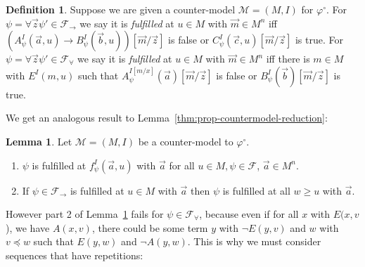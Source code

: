 \documentclass[a4paper,12pt]{report}
\theoremstyle{definition}
\theoremstyle{definition}
\theoremstyle{definition}
\newtheorem{lemma}[theorem]{Lemma}
\theoremstyle{definition}
\theoremstyle{definition}
\newtheorem{definition}[theorem]{Definition}
\theoremstyle{definition}
\theoremstyle{definition}
\begin{document}
	
	\begin{definition}
		\label{def:fo-fulfilled}
		Suppose we are given a counter-model $\mathcal M = (M, I)$ for $\varphi^\circ$. For $\psi = \forall\vec z\psi'\in\mathcal F_\to$ we say it is \emph{fulfilled} at $u\in M$ with $\vec m\in M^n$ iff $(A_\psi^I(\vec a, u)\to B_\psi^I(\vec b, u))[\vec m/\vec z]$ is false or $C_\psi^I(\vec c, u)[\vec m/\vec z]$ is true.
		For $\psi = \forall\vec z\psi'\in\mathcal F_\forall$ we say it is \emph{fulfilled} at $u\in M$ with $\vec m\in M^n$ iff there is $m\in M$ with $E^{I}(m, u)$ such that $A^{I[m/x]}_\psi(\vec a)[\vec m/\vec z]$ is false or $B_\psi^I(\vec b)[\vec m/\vec z]$ is true.
	\end{definition}
	
	We get an analogous result to Lemma~\ref{thm:prop-countermodel-reduction}:
	
	\begin{lemma}
		\label{thm:fo-countermodel-reduction}
		Let $\mathcal M = (M, I)$ be a counter-model to $\mathcal \varphi^\circ$.
		\begin{enumerate}
			\item $\psi$ is fulfilled at $f_\psi^I(\vec a, u)$ with $\vec a$ for all $u\in M, \psi\in\mathcal F$, $\vec a\in M^n$.
			\item If $\psi\in\mathcal F_\to$ is fulfilled at $u\in M$ with $\vec a$ then $\psi$ is fulfilled at all $w\geq u$ with $\vec a$.
		\end{enumerate}	
	\end{lemma}
	
	However part 2 of Lemma~\ref{thm:fo-countermodel-reduction} fails for $\psi\in\mathcal F_\forall$, because even if for all $x$ with $E(x, v$), we have $A(x, v)$, there could be some term $y$ with $\neg E(y, v)$ and $w$ with $v\preceq w$ such that $E(y, w)$ and $\neg A(y, w)$. This is why we must consider sequences that have repetitions:
	
\end{document}
